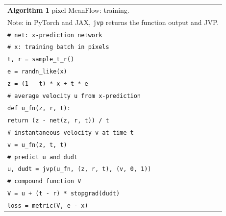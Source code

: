 \documentclass[10pt]{article}
\newcommand{\cm}[1]{\textcolor{codecomment}{#1}}
\newcommand{\kw}[1]{\textcolor{codekw}{#1}}
\newcommand{\fn}[1]{\textcolor{codekw}{#1}}
\newcommand{\op}[1]{\textcolor{codeop}{#1}}
\begin{document}
\graphicspath{{assets/}}
\noindent
\fontsize{8.5}{10}\selectfont
\begin{tabular}{@{}p{\linewidth}@{}}
\toprule
{\fontsize{10}{11.5}\selectfont\textbf{Algorithm 1} pixel MeanFlow: training.}\\
{\fontsize{6.8}{8}\selectfont Note: in PyTorch and JAX, \texttt{jvp} returns the function output and JVP.}\\
\midrule
\texttt{\cm{\# net: x-prediction network}}\\
\texttt{\cm{\# x: training batch in pixels}}\\[0.7em]
\texttt{t, r = \fn{sample\_t\_r}()}\\
\texttt{e = \fn{randn\_like}(x)}\\[0.7em]
\texttt{z = (1 \op{-} t) \op{*} x \op{+} t \op{*} e}\\[0.7em]
\texttt{\cm{\# average velocity u from x-prediction}}\\
\texttt{\kw{def} u\_fn(z, r, t):}\\
\texttt{\hspace*{2em}\kw{return} (z \op{-} net(z, r, t)) \op{/} t}\\[0.7em]
\texttt{\cm{\# instantaneous velocity v at time t}}\\
\texttt{v = u\_fn(z, t, t)}\\[0.7em]
\texttt{\cm{\# predict u and dudt}}\\
\texttt{u, dudt = \fn{jvp}(u\_fn, (z, r, t), (v, 0, 1))}\\[0.7em]
\texttt{\cm{\# compound function V}}\\
\texttt{V = u \op{+} (t \op{-} r) \op{*} \kw{stopgrad}(dudt)}\\[0.7em]
\texttt{loss = \fn{metric}(V, e \op{-} x)}\\
\midrule
\end{tabular}
\end{document}
